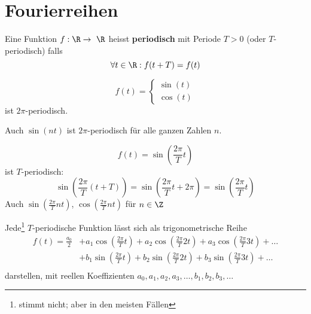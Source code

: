 \chapter{Fourierreihen}
\begin{def*}[note = Periodische Funktion , index = periodische Funktion , indexformat = {2!~1}]
	Eine Funktion $f: \R \rightarrow \R$ heisst \textbf{periodisch} mit Periode $T > 0$ (oder $T$-periodisch) falls
	\[ \forall t \in \R : f(t+T) = f(t) \]
\end{def*}
\begin{bsp*}
	\[ f(t) = \begin{cases} \sin(t) \\ \cos(t) \end{cases} \]
	ist $2\pi$-periodisch.
	
	Auch $\sin(nt)$ ist $2\pi$-periodisch für alle ganzen Zahlen $n$.
\end{bsp*}
\begin{bsp*}
	\[ f(t) = \sin\left( \frac{2\pi}{T} t \right) \]
	ist $T$-periodisch:
	\[ \sin\left( \frac{2\pi}{T} (t+T) \right) = \sin\left( \frac{2\pi}{T} t +2\pi \right) = \sin\left( \frac{2\pi}{T} t \right) \]
	Auch $\sin\left( \frac{2\pi}{T} nt \right)$, $\cos\left( \frac{2\pi}{T} nt \right)$ für $n \in \Z$
\end{bsp*}

\begin{satz*}[note = J. Fourier 1807]
	Jede\footnote{stimmt nicht; aber in den meisten Fällen} $T$-periodische Funktion lässt sich als trigonometrische Reihe
	\[ \begin{split}
		f(t) = \frac{a_0}{2}	&+ a_1 \cos\left( \frac{2\pi}{T} t \right) + a_2 \cos\left( \frac{2\pi}{T} 2t \right) + a_3 \cos\left( \frac{2\pi}{T} 3t \right) + \dots \\
						&+ b_1 \sin\left( \frac{2\pi}{T} t \right) + b_2 \sin\left( \frac{2\pi}{T} 2t \right) + b_3 \sin\left( \frac{2\pi}{T} 3t \right) + \dots \\
	\end{split} \]
	darstellen, mit reellen Koeffizienten $a_0 , a_1 , a_2 , a_3 , \dotsc , b_1 , b_2 , b_3 , \dotsc$
\end{satz*}


